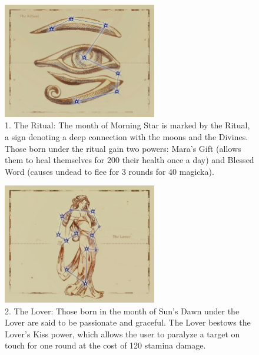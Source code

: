 \documentclass[12pt]{book}
\begin{document}
\begin{figure}[H]
\includegraphics[width=0.6\textwidth]{Ritual.png}
\centering
\caption*{1. The Ritual: The month of Morning Star is marked by the Ritual, a sign denoting a deep connection with the moons and the Divines. Those born under the ritual gain two powers: Mara's Gift (allows them to heal themselves for 200 their health once a day) and Blessed Word (causes undead to flee for 3 rounds for 40 magicka).}
\end{figure}

\begin{figure}[H]
\includegraphics[width=0.6\textwidth]{Lover.png}
\centering
\caption*{2. The Lover: Those born in the month of Sun's Dawn under the Lover are said to be passionate and graceful. The Lover bestows the Lover's Kiss power, which allows the user to paralyze a target on touch for one round at the cost of 120 stamina damage.}
\end{figure}
\end{document}
